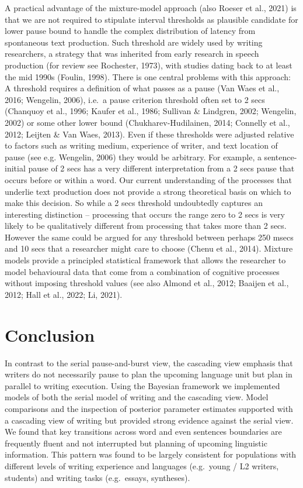 \documentclass[
  man,floatsintext]{apa7}
\begin{document}
A practical advantage of the mixture-model approach (also Roeser et al., 2021) is that we are not required to stipulate interval thresholds as plausible candidate for lower pause bound to handle the complex distribution of latency from spontaneous text production. Such threshold are widely used by writing researchers, a strategy that was inherited from early research in speech production (for review see Rochester, 1973), with studies dating back to at least the mid 1990s (Foulin, 1998). There is one central problems with this approach: A threshold requires a definition of what passes as a pause (Van Waes et al., 2016; Wengelin, 2006), i.e.~a pause criterion threshold often set to 2 secs (Chanquoy et al., 1996; Kaufer et al., 1986; Sullivan \& Lindgren, 2002; Wengelin, 2002) or some other lower bound (Chukharev-Hudilainen, 2014; Connelly et al., 2012; Leijten \& Van Waes, 2013). Even if these thresholds were adjusted relative to factors such as writing medium, experience of writer, and text location of pause (see e.g. Wengelin, 2006) they would be arbitrary. For example, a sentence-initial pause of 2 secs has a very different interpretation from a 2 secs pause that occurs before or within a word. Our current understanding of the processes that underlie text production does not provide a strong theoretical basis on which to make this decision. So while a 2 secs threshold undoubtedly captures an interesting distinction -- processing that occurs the range zero to 2 secs is very likely to be qualitatively different from processing that takes more than 2 secs. However the same could be argued for any threshold between perhaps 250 msecs and 10 secs that a researcher might care to choose (Chenu et al., 2014). Mixture models provide a principled statistical framework that allows the researcher to model behavioural data that come from a combination of cognitive processes without imposing threshold values (see also Almond et al., 2012; Baaijen et al., 2012; Hall et al., 2022; Li, 2021).

\hypertarget{conclusion}{%
\section{Conclusion}\label{conclusion}}

In contrast to the serial pause-and-burst view, the cascading view emphasis that writers do not necessarily pause to plan the upcoming language unit but plan in parallel to writing execution. Using the Bayesian framework we implemented models of both the serial model of writing and the cascading view. Model comparisons and the inspection of posterior parameter estimates supported with a cascading view of writing but provided strong evidence against the serial view. We found that key transitions across word and even sentences boundaries are frequently fluent and not interrupted but planning of upcoming linguistic information. This pattern was found to be largely consistent for populations with different levels of writing experience and languages (e.g.~young / L2 writers, students) and writing tasks (e.g.~essays, syntheses).
\end{document}
